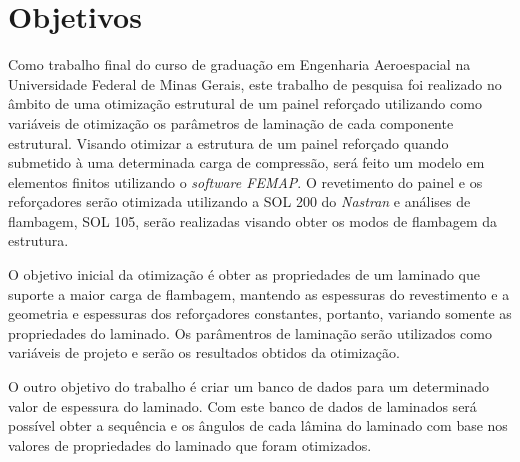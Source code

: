 \chapter{Objetivos}

Como trabalho final do curso de graduação em Engenharia Aeroespacial na Universidade Federal de Minas Gerais, este trabalho de pesquisa foi realizado no âmbito de uma otimização estrutural de um painel reforçado utilizando como variáveis de otimização os parâmetros de laminação de cada componente estrutural.
Visando otimizar a estrutura de um painel reforçado quando submetido à uma determinada carga de compressão, será feito um modelo em elementos finitos utilizando o \emph{software FEMAP}. O revetimento do painel e os reforçadores serão otimizada utilizando a SOL 200 do \emph{Nastran} e análises de flambagem, SOL 105, serão realizadas visando obter os modos de flambagem da estrutura.

O objetivo inicial da otimização é obter as propriedades de um laminado que suporte a maior carga de flambagem, mantendo as espessuras do revestimento e a geometria e espessuras dos reforçadores constantes, portanto, variando somente as propriedades do laminado. Os parâmentros de laminação serão utilizados como variáveis de projeto e serão os resultados obtidos da otimização.

O outro objetivo do trabalho é criar um banco de dados para um determinado valor de espessura do laminado. Com este banco de dados de laminados será possível obter a sequência e os ângulos de cada lâmina do laminado com base nos valores de propriedades do laminado que foram otimizados.
